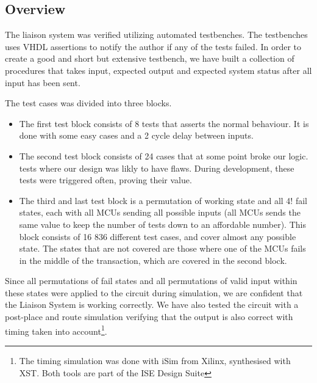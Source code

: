 \subsection{Overview}
The liaison system was verified utilizing automated testbenches. The testbenches uses VHDL assertions to notify the author if any
of the tests failed. In order to create a good and short but extensive testbench, we have built a collection of procedures that takes input, expected output
and expected system status after all input has been sent.

The test cases was divided into three blocks.
\begin{itemize}
\item The first test block consists of 8 tests that asserts the normal behaviour. It is done with some easy cases and a 2 cycle delay between inputs.

\item The second test block consists of 24 cases that at some point broke our logic.  tests where our design was likly to have flaws. During development, these tests were
triggered often, proving their value.

\item The third and last test block is a permutation of working state and all 4! fail states, each with all MCUs sending
all possible inputs (all MCUs sends the same value to keep the number of tests down to an affordable number). This block consists of 16 836 different test cases,
and cover almost any possible state. The states that are not covered are those where one of the MCUs fails in the middle of the transaction, which are covered in
the second block.
\end{itemize}

Since all permutations of fail states and all permutations of valid input within these states
were applied to the circuit during simulation, we are confident that the Liaison System is working correctly. We have also tested the circuit with a post-place and route
simulation verifying that the output is also correct with timing taken into account\footnote{The timing simulation was done with iSim from Xilinx, synthesised with XST. Both tools are part of the ISE Design Suite}.

